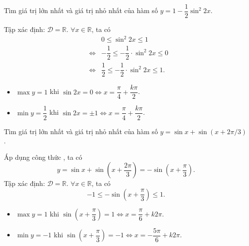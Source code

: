 \begin{bt}%
	Tìm giá trị lớn nhất và giá trị nhỏ nhất của hàm số $ y=1-\dfrac{1}{2} \sin ^{2} 2 x $.
	\loigiai
	{
		Tập xác định: $ \mathscr{D}=\mathbb{R}$. $ \forall x \in \mathbb{R} $, ta có 
		\begin{eqnarray*}
			&& 0 \leq  \sin ^{2} 2 x \leq 1\\
			&\Leftrightarrow& -\dfrac{1}{2} \leq  -\dfrac{1}{2}\cdot\sin ^{2} 2 x \leq 0\\
			&\Leftrightarrow& \dfrac{1}{2} \leq  -\dfrac{1}{2}\cdot\sin ^{2} 2 x \leq 1.
		\end{eqnarray*}
		\begin{itemize}
			\item $ \max y=1 $ khi $ \sin  2 x=0 \Leftrightarrow x=\dfrac{\pi}{4}+\dfrac{k\pi}{2}$.
			\item $ \min y=\dfrac{1}{2} $ khi $ \sin  2 x=\pm1 \Leftrightarrow x=\dfrac{\pi}{4}+\dfrac{k\pi}{2}$.
		\end{itemize}
		
	}
\end{bt}
\begin{bt}%
	Tìm giá trị lớn nhất và giá trị nhỏ nhất của hàm số $ y=\sin x+\sin (x+2 \pi / 3) $.
	\loigiai
	{
		Áp dụng công thức , ta có
		\begin{equation*}
			y=\sin x + \sin \left (x+\dfrac{2\pi}{3}\right )=-\sin \left (x+\dfrac{\pi}{3}\right ).
		\end{equation*}
		Tập xác định: $ \mathscr{D}=\mathbb{R}$. $ \forall x \in \mathbb{R} $, ta có 
		\begin{equation*}
			-1 \leq -\sin \left (x+\dfrac{\pi}{3}\right ) \leq 1.
		\end{equation*}
		\begin{itemize}
			\item $ \max y=1 $ khi $ \sin \left (x+\dfrac{\pi}{3}\right )=1 \Leftrightarrow x=\dfrac{\pi}{6}+k2\pi$.
			\item $ \min y=-1 $ khi $ \sin \left (x+\dfrac{\pi}{3}\right )=-1 \Leftrightarrow x=-\dfrac{5\pi}{6}+k2\pi$.
		\end{itemize}
		
	}
\end{bt}
